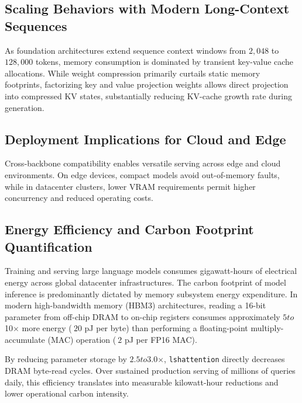 \subsection{Scaling Behaviors with Modern Long-Context Sequences}
As foundation architectures extend sequence context windows from $2{,}048$ to $128{,}000$ tokens, memory consumption is dominated by transient key-value cache allocations. While weight compression primarily curtails static memory footprints, factorizing key and value projection weights allows direct projection into compressed KV states, substantially reducing KV-cache growth rate during generation.

\subsection{Deployment Implications for Cloud and Edge}
Cross-backbone compatibility enables versatile serving across edge and cloud environments. On edge devices, compact models avoid out-of-memory faults, while in datacenter clusters, lower VRAM requirements permit higher concurrency and reduced operating costs.

\subsection{Energy Efficiency and Carbon Footprint Quantification}
Training and serving large language models consumes gigawatt-hours of electrical energy across global datacenter infrastructures. The carbon footprint of model inference is predominantly dictated by memory subsystem energy expenditure. In modern high-bandwidth memory (HBM3) architectures, reading a 16-bit parameter from off-chip DRAM to on-chip registers consumes approximately $5$\times$ to $10$\times$ more energy ($~20$ pJ per byte) than performing a floating-point multiply-accumulate (MAC) operation ($~2$ pJ per FP16 MAC).

By reducing parameter storage by $2.5$\times$ to $3.0$\times$, \texttt{lshattention} directly decreases DRAM byte-read cycles. Over sustained production serving of millions of queries daily, this efficiency translates into measurable kilowatt-hour reductions and lower operational carbon intensity.
